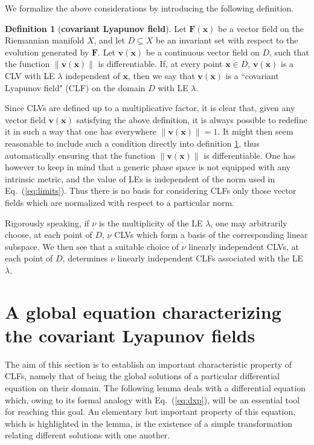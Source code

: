 \documentclass{article}
\theoremstyle{plain}
\theoremstyle{definition}
\newtheorem{definition}[theorem]{Definition}
\theoremstyle{remark}
\newcommand{\vect}[1]{\boldsymbol{#1}}
\begin{document}
We formalize the above considerations by introducing the following
definition.

\begin{definition}[{\bf covariant Lyapunov field}]\label{def:lvf}
  Let $\vect{F}(\vect{x})$ be a vector field on the Riemannian
  manifold $X$, and let $D\subseteq X$ be an invariant set with
  respect to the evolution generated by $\vect{F}$. Let
  $\vect{v}(\vect{x})$ be a continuous vector field on $D$, such that 
the function $\lVert \vect{v}(\vect{x})\rVert$ is differentiable.
  If, at every point $\vect{x}\in D$, $\vect{v}(\vect{x})$ is a CLV
  with LE $\lambda$ independent of $\vect{x}$, then we say that
  $\vect{v}(\vect{x})$ is a ``covariant Lyapunov field" (CLF) on the
  domain $D$ with LE $\lambda$.
\end{definition}

Since CLVs are defined up to a multiplicative factor, 
it is clear that, given any vector field $\vect{v}(\vect{x})$
satisfying the above definition, it is always possible to
redefine it in such a way that one has everywhere
$\lVert \vect{v}(\vect{x})\rVert = 1$. 
It might then seem reasonable
to include such a condition directly into
 definition \ref{def:lvf}, thus automatically ensuring that 
the function $\lVert \vect{v}(\vect{x})\rVert$ is differentiable.
One has however to keep in mind that a
generic phase space is not equipped with 
any intrinsic metric, and the value of LEs is independent of
the norm used in Eq.~(\ref{eq:limits}). Thus there is no basis
for considering CLFs only those vector fields
which are normalized with respect to a particular norm.

Rigorously speaking, 
if $\nu$ is the multiplicity of the LE $\lambda$, one may
arbitrarily choose, at each point of $D$, $\nu$ CLVs which form a
basis of the corresponding linear subspace. 
We then see that a suitable choice of $\nu$ linearly independent CLVs,
at each point of $D$, determines $\nu$ linearly independent CLFs
associated with the LE $\lambda$.  


\section{A global equation characterizing the covariant Lyapunov fields}

The aim of this section is to establish an important characteristic property
of CLFs, namely that of being 
the global solutions of a particular differential equation on their domain. 
The following lemma deals with a differential
equation which, owing to its formal analogy with Eq.~(\ref{eq:dxp}),
will be an essential tool for reaching this goal.  An elementary but
important property of this equation, which is highlighted in the
lemma, is the existence of a simple transformation relating different
solutions with one another.
\end{document}
